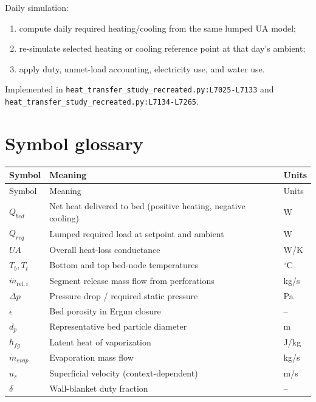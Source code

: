 \documentclass[11pt]{article}
\newcommand{\srcref}[1]{\nolinkurl{#1}}
\begin{document}
Daily simulation:
\begin{enumerate}[leftmargin=*]
\item compute daily required heating/cooling from the same lumped UA model;
\item re-simulate selected heating or cooling reference point at that day's ambient;
\item apply duty, unmet-load accounting, electricity use, and water use.
\end{enumerate}
Implemented in
\srcref{heat_transfer_study_recreated.py:L7025-L7133} and
\srcref{heat_transfer_study_recreated.py:L7134-L7265}.

\section{Symbol glossary}
\begin{longtable}{L{0.22\textwidth}L{0.57\textwidth}L{0.17\textwidth}}
\toprule
Symbol & Meaning & Units \\
\midrule
\endfirsthead
\toprule
Symbol & Meaning & Units \\
\midrule
\endhead
\(Q_{bed}\) & Net heat delivered to bed (positive heating, negative cooling) & W \\
\(Q_{req}\) & Lumped required load at setpoint and ambient & W \\
\(UA\) & Overall heat-loss conductance & W/K \\
\(T_b, T_t\) & Bottom and top bed-node temperatures & \(^{\circ}\)C \\
\(\dot m_{\mathrm{rel},i}\) & Segment release mass flow from perforations & kg/s \\
\(\Delta p\) & Pressure drop / required static pressure & Pa \\
\(\epsilon\) & Bed porosity in Ergun closure & -- \\
\(d_p\) & Representative bed particle diameter & m \\
\(h_{fg}\) & Latent heat of vaporization & J/kg \\
\(\dot m_{evap}\) & Evaporation mass flow & kg/s \\
\(u_s\) & Superficial velocity (context-dependent) & m/s \\
\(\delta\) & Wall-blanket duty fraction & -- \\
\bottomrule
\end{longtable}
\end{document}
